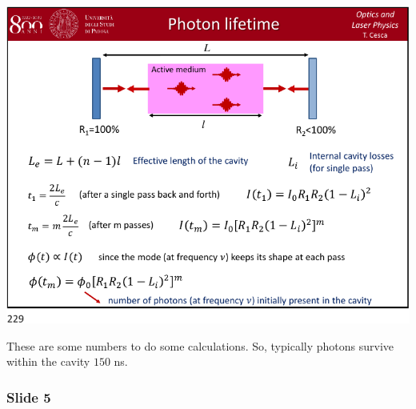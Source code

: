 \documentclass[../main/main.tex]{subfiles}
\begin{document}
\begin{minipage}[]{0.5\linewidth}
\centering
\includegraphics[page=4,width=1\textwidth]{../lessons/pdf_file/12_lecture.pdf}
\end{minipage}
\hspace{0.3cm}\vspace{0.3cm}
\begin{minipage}[c]{0.47\linewidth}

These are some numbers to do some calculations.
So, typically photons survive within the cavity \( 150 \) ns.

\end{minipage}

\subsubsection*{Slide 5}
\end{document}
